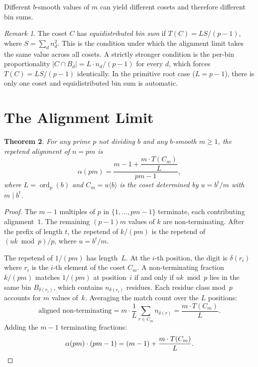 \documentclass[12pt]{amsart}
\newtheorem{theorem}{Theorem}
\theoremstyle{definition}
\theoremstyle{remark}
\newtheorem{remark}[theorem]{Remark}
\begin{document}
Different $b$-smooth values of $m$ can yield different
cosets and therefore different bin sums.

\begin{remark}\label{rem:equidist}
The coset $C$ has \emph{equidistributed bin sum} if
$T(C) = LS/(p{-}1)$, where $S = \sum_d n_d^2$. This is
the condition under which the alignment limit takes the
same value across all cosets. A strictly stronger
condition is the per-bin proportionality
$|C \cap B_d| = L \cdot n_d / (p{-}1)$ for every $d$,
which forces $T(C) = LS/(p{-}1)$ identically. In the
primitive root case ($L = p{-}1$), there is only one
coset and equidistributed bin sum is automatic.
\end{remark}

\section{The Alignment Limit}

\begin{theorem}\label{thm:exact}
For any prime $p$ not dividing $b$ and any $b$-smooth
$m \ge 1$, the repetend alignment of $n = pm$ is
\[
\alpha(pm) = \frac{m - 1 + \dfrac{m \cdot T(C_m)}{L}}{pm - 1},
\]
where $L = \operatorname{ord}_p(b)$ and $C_m = u\langle b \rangle$
is the coset determined by $u = b^t/m$ with $m \mid b^t$.
\end{theorem}

\begin{proof}
The $m - 1$ multiples of $p$ in $\{1, \ldots, pm{-}1\}$ terminate,
each contributing alignment~$1$. The remaining $(p{-}1)m$ values
of $k$ are non-terminating. After the prefix of length $t$, the
repetend of $k/(pm)$ is the repetend of $(uk \bmod p)/p$, where
$u = b^t/m$.

The repetend of $1/(pm)$ has length~$L$. At the $i$-th
position, the digit is $\delta(r_i)$ where $r_i$ is the
$i$-th element of the coset $C_m$. A non-terminating
fraction $k/(pm)$ matches $1/(pm)$ at position~$i$ if and
only if $uk \bmod p$ lies in the same bin $B_{\delta(r_i)}$,
which contains $n_{\delta(r_i)}$ residues. Each residue
class mod~$p$ accounts for $m$ values of~$k$. Averaging the
match count over the $L$ positions:
\[
\text{aligned non-terminating} = m \cdot \frac{1}{L}
\sum_{r \in C_m} n_{\delta(r)} = \frac{m \cdot T(C_m)}{L}.
\]
Adding the $m - 1$ terminating fractions:
\[
\alpha(pm) \cdot (pm - 1)
= (m - 1) + \frac{m \cdot T(C_m)}{L}.
\qedhere
\]
\end{proof}
\end{document}
